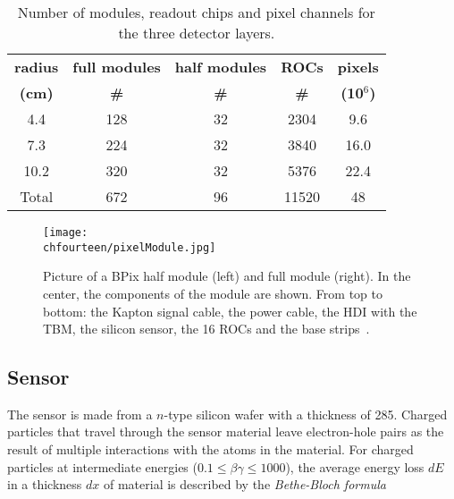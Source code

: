 \begin{table}[!htb]
  \caption{\small Number of modules, readout chips and pixel channels for the three detector layers.}
  \smallskip
  \centering
  \begin{tabular}{|c|c|c|c|c|}
    \hline
    {\bfseries radius} & {\bfseries full modules} & {\bfseries half modules} & {\bfseries ROCs}  & {\bfseries pixels}  \\
    {\bfseries (cm)}   & {\bfseries \#          } & {\bfseries \#          } & {\bfseries \#  }  & {\bfseries (10$^6$)}\\ \hline \hline
    4.4                & 128                      & 32                       & 2304              & 9.6     \\
    7.3                & 224                      & 32                       & 3840              & 16.0      \\ 
    10.2               & 320                      & 32                       & 5376              & 22.4    \\
    Total              & 672                      & 96                       & 11520             & 48      \\ \hline
  \end{tabular}
  \label{tab:Nmodules}
\end{table}

\begin{figure}[!htb]
 \begin{center}
 \texttt{[image: \\chfourteen/pixelModule.jpg]}
 \end{center}
 \caption{Picture of a BPix half module (left) and full module (right). In the center, the components of the module are shown. From top to bottom: the Kapton signal cable, the power cable, the HDI with the TBM, the silicon sensor, the 16 ROCs and the base strips~\cite{Konig200662}.}
 \label{fig:BpixMod}
\end{figure}

\subsection{Sensor}

The sensor is made from a $n$-type silicon wafer with a thickness of 285\mum.
Charged particles that travel through the sensor material leave electron-hole pairs as the result of multiple interactions with the atoms in the material.
For charged particles at intermediate energies ($0.1 \leq \beta\gamma \leq 1000$), the average energy loss $dE$ in a thickness $dx$ of material is described by the \textit{Bethe-Bloch formula}

